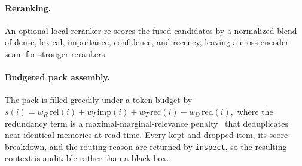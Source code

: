 \paragraph{Reranking.} An optional local reranker re-scores the fused candidates
by a normalized blend of dense, lexical, importance, confidence, and recency,
leaving a cross-encoder seam for stronger rerankers.

\paragraph{Budgeted pack assembly.} The pack is filled greedily under a token
budget by
\(
s(i) = w_R\,\mathrm{rel}(i) + w_I\,\mathrm{imp}(i) + w_T\,\mathrm{rec}(i)
 - w_D\,\mathrm{red}(i),
\)
where the redundancy term is a maximal-marginal-relevance penalty~\cite{carbonell1998mmr}
that deduplicates near-identical memories at read time. Every kept and dropped
item, its score breakdown, and the routing reason are returned by
\texttt{inspect}, so the resulting context is auditable rather than a black box.

